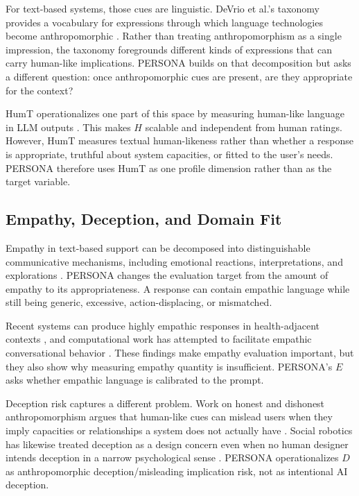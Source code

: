 \documentclass[manuscript,review,anonymous]{acmart}
\begin{document}
For text-based systems, those cues are linguistic. DeVrio et al.'s taxonomy provides a vocabulary for expressions through which language technologies become anthropomorphic \cite{devrio2025}. Rather than treating anthropomorphism as a single impression, the taxonomy foregrounds different kinds of expressions that can carry human-like implications. PERSONA builds on that decomposition but asks a different question: once anthropomorphic cues are present, are they appropriate for the context?

HumT operationalizes one part of this space by measuring human-like language in LLM outputs \cite{cheng2025}. This makes $H$ scalable and independent from human ratings. However, HumT measures textual human-likeness rather than whether a response is appropriate, truthful about system capacities, or fitted to the user's needs. PERSONA therefore uses HumT as one profile dimension rather than as the target variable.

\subsection{Empathy, Deception, and Domain Fit}

Empathy in text-based support can be decomposed into distinguishable communicative mechanisms, including emotional reactions, interpretations, and explorations \cite{sharma2020}. PERSONA changes the evaluation target from the amount of empathy to its appropriateness. A response can contain empathic language while still being generic, excessive, action-displacing, or mismatched.

Recent systems can produce highly empathic responses in health-adjacent contexts \cite{ayers2023}, and computational work has attempted to facilitate empathic conversational behavior \cite{sharma2021}. These findings make empathy evaluation important, but they also show why measuring empathy quantity is insufficient. PERSONA's $E$ asks whether empathic language is calibrated to the prompt.

Deception risk captures a different problem. Work on honest and dishonest anthropomorphism argues that human-like cues can mislead users when they imply capacities or relationships a system does not actually have \cite{kaminski2017,leong2019}. Social robotics has likewise treated deception as a design concern even when no human designer intends deception in a narrow psychological sense \cite{sharkey2021}. PERSONA operationalizes $D$ as anthropomorphic deception/misleading implication risk, not as intentional AI deception.
\end{document}
